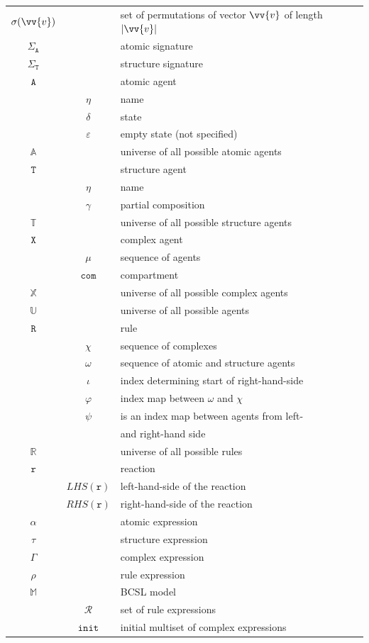 \documentclass[12pt]{fithesis2}
\begin{document}
\begin{tabular}{c c | l}
$\sigma(\vv{v})$ & & set of permutations of vector $\vv{v}$ of length $|\vv{v}|$\\
$\Sigma_{\mathtt{A}}$ & & atomic signature \\
$\Sigma_{\mathtt{T}}$ & & structure signature \\
$\mathtt{A}$ & & atomic agent \\
 & $\eta$ & name \\
 & $\delta$ & state \\
 & $\varepsilon$ & empty state (not specified)\\
$\mathds{A}$ & & universe of all possible atomic agents \\
$\mathtt{T}$ & & structure agent \\
 & $\eta$ & name \\
 & $\gamma$ & partial composition\\
$\mathds{T}$ & & universe of all possible structure agents\\
$\mathtt{X}$ & & complex agent\\
 & $\mu$ & sequence of agents\\
 & $\mathtt{com}$ & compartment\\
$\mathds{X}$ & & universe of all possible complex agents\\
$\mathds{U}$ & & universe of all possible agents\\
$\mathtt{R}$ & & rule\\
 & $\chi$ & sequence of complexes\\
 & $\omega$ & sequence of atomic and structure agents\\
 & $\iota$ & index determining start of right-hand-side\\
 & $\varphi$ & index map between $\omega$ and $\chi$\\
 & $\psi$ & is an index map between agents from left-\\
 & & and right-hand side\\
$\mathds{R}$ & & universe of all possible rules\\
$\mathtt{r}$ & & reaction\\
 & $LHS(\mathtt{r})$ & left-hand-side of the reaction\\
 & $RHS(\mathtt{r})$ & right-hand-side of the reaction\\
$\alpha$ & & atomic expression\\
$\tau$ & & structure expression\\
$\Gamma$ & & complex expression\\
$\rho$ & & rule expression\\
$\mathds{M}$ & & BCSL model\\
 & $\mathcal{R}$ & set of rule expressions\\
 & $\mathtt{init}$ & initial multiset of complex expressions\\
\end{tabular}
\end{document}

